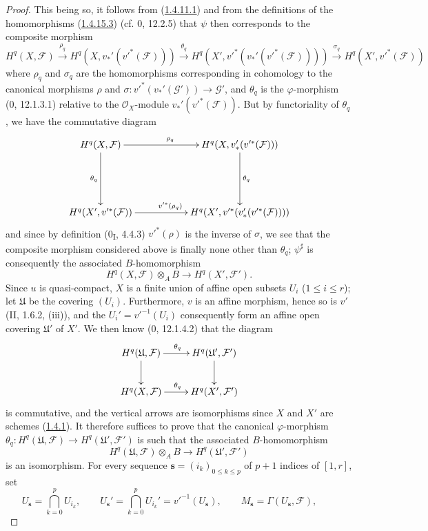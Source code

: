 \begin{proof}
This being so, it follows from
(\hyperref[III.1.4.11.1]{1.4.11.1}) and from the definitions of the
homomorphisms (\hyperref[III.1.4.15.3]{1.4.15.3})
(cf. 0, 12.2.5) that $\psi$ then corresponds to the composite morphism
\[
H^q(X,\mathcal F)\xrightarrow{\rho_q}
H^q(X,v_*'(v'^*(\mathcal F)))\xrightarrow{\theta_q}
H^q(X',v'^*(v_*'(v'^*(\mathcal F))))\xrightarrow{\sigma_q}
H^q(X',v'^*(\mathcal F))
\]
where $\rho_q$ and $\sigma_q$ are the homomorphisms corresponding in
cohomology to the canonical morphisms $\rho$ and
$\sigma:v'^*(v_*'(\mathcal G'))\to\mathcal G'$, and $\theta_q$ is the
$\varphi$-morphism (0, 12.1.3.1) relative to the $\mathcal O_X$-module
$v_*'(v'^*(\mathcal F))$. But by functoriality of $\theta_q$, we have the
commutative diagram
\[
\xymatrix{
H^q(X,\mathcal F)\ar[rr]^{\rho_q}\ar[dd]_{\theta_q}
&&H^q(X,v_*'(v'^*(\mathcal F)))\ar[dd]^{\theta_q}\\\\
H^q(X',v'^*(\mathcal F))\ar[rr]^{v'^*(\rho_q)}
&&H^q(X',v'^*(v_*'(v'^*(\mathcal F))))
}
\]
and since by definition (0\textsubscript{I}, 4.4.3) $v'^*(\rho)$ is
the inverse of $\sigma$, we see that the composite morphism considered above
is finally none other than $\theta_q$; $\psi^\sharp$ is consequently the
associated $B$-homomorphism
\[
H^q(X,\mathcal F)\otimes_A B\longrightarrow H^q(X',\mathcal F').
\]
Since $u$ is quasi-compact, $X$ is a finite union of affine open subsets $U_i$
($1\leq i\leq r$); let $\mathfrak U$ be the covering $(U_i)$. Furthermore,
$v$ is an affine morphism, hence so is $v'$ (II, 1.6.2,
(iii)), and the $U_i'=v'^{-1}(U_i)$ consequently form an affine open
covering $\mathfrak U'$ of $X'$. We then know (0, 12.1.4.2) that the diagram
\[
\xymatrix{
H^q(\mathfrak U,\mathcal F)\ar[r]^{\theta_q}\ar[d]
&H^q(\mathfrak U',\mathcal F')\ar[d]\\
H^q(X,\mathcal F)\ar[r]^{\theta_q}&H^q(X',\mathcal F')
}
\]
is commutative, and the vertical arrows are isomorphisms since
$X$ and $X'$ are schemes (\hyperref[III.1.4.1]{1.4.1}). It therefore
suffices to prove that the canonical $\varphi$-morphism
$\theta_q:H^q(\mathfrak U,\mathcal F)\to H^q(\mathfrak U',\mathcal F')$
is such that the associated $B$-homomorphism
\[
H^q(\mathfrak U,\mathcal F)\otimes_A B
\longrightarrow H^q(\mathfrak U',\mathcal F')
\]
is an isomorphism. For every sequence
$\mathbf s=(i_k)_{0\leq k\leq p}$ of $p+1$ indices of $[1,r]$, set
\[
U_{\mathbf s}=\bigcap_{k=0}^pU_{i_k},\qquad
U_{\mathbf s}'=\bigcap_{k=0}^pU_{i_k}'=v'^{-1}(U_{\mathbf s}),\qquad
M_{\mathbf s}=\Gamma(U_{\mathbf s},\mathcal F),\qquad
\]
\end{proof}
